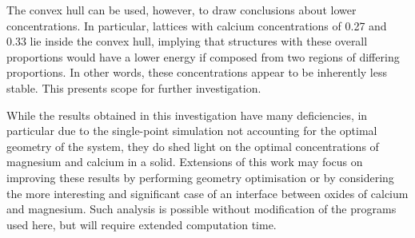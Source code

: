 \documentclass[a4paper,12pt]{article}
\begin{document}
\begin{multicols}{2}
    The convex hull can be used, however, to draw conclusions about lower concentrations. In particular, lattices with calcium concentrations of 0.27 and 0.33 lie inside the convex hull, implying that structures with these overall proportions would have a lower energy if composed from two regions of differing proportions. In other words, these concentrations appear to be inherently less stable. This presents scope for further investigation.
    
	While the results obtained in this investigation have many deficiencies, in particular due to the single-point simulation not accounting for the optimal geometry of the system, they do shed light on the optimal concentrations of magnesium and calcium in a solid. Extensions of this work may focus on improving these results by performing geometry optimisation or by considering the more interesting and significant case of an interface between oxides of calcium and magnesium. Such analysis is possible without modification of the programs used here, but will require extended computation time.
	
\raggedright


\end{multicols}
\end{document}
